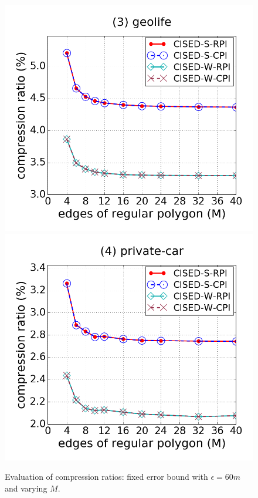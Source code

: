 \begin{figure}[tb!]
\includegraphics[scale = 0.250]{figures/Exp-M-e-60-CR-geolife.png}
\includegraphics[scale = 0.250]{figures/Exp-M-e-60-CR-private.png}
\vspace{-2ex}
\caption{\small Evaluation of compression ratios: fixed error bound with $\epsilon=60m$ and varying $M$.}
\label{fig:m-cr-e60}
\vspace{-2ex}
\end{figure}


